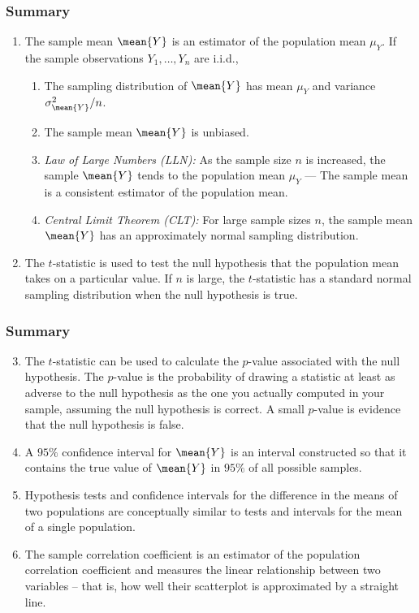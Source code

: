 

\begin{frame}
\frametitle{Summary}
\begin{enumerate}
\item The sample mean $\mean{Y}$ is an estimator of the population mean $\mu_{Y}$. If the sample observations $Y_1,\ldots,Y_n$ are i.i.d.,
\begin{enumerate}
\item The sampling distribution of $\mean{Y}$ has mean $\mu_{Y}$ and variance $\sigma^2_{\mean{Y}}/n$.
\item The sample mean $\mean{Y}$ is unbiased.
\item \textit{Law of Large Numbers (LLN):} As the sample size $n$ is increased, the sample $\mean{Y}$ tends to the population mean $\mu_{Y}$ --- The sample mean is a consistent estimator of the population mean.
\item \textit{Central Limit Theorem (CLT):} For large sample sizes $n$, the sample mean $\mean{Y}$ has an approximately normal sampling distribution.
\end{enumerate}
\item The $t$-statistic is used to test the null hypothesis that the population mean takes on a particular value. If $n$ is large, the $t$-statistic has a standard normal sampling distribution when the null hypothesis is true.
\end{enumerate}
\end{frame}


\begin{frame}
\frametitle{Summary}
\begin{enumerate}\setcounter{enumi}{2}
\item The $t$-statistic can be used to calculate the $p$-value associated with the null hypothesis. The $p$-value is the probability of drawing a statistic at least as adverse to the null hypothesis as the one you actually computed in your sample, assuming the null hypothesis is correct. A small $p$-value is evidence that the null hypothesis is false.
\item A $95\%$ confidence interval for $\mean{Y}$ is an interval constructed so that it contains the true value of $\mean{Y}$ in $95\%$ of all possible samples.
\item Hypothesis tests and confidence intervals for the difference in the means of two populations are conceptually similar to tests and intervals for the mean of a single population.
\item The sample correlation coefficient is an estimator of the population correlation coefficient and measures the linear relationship between two variables -- that is, how well their scatterplot is approximated by a straight line.
\end{enumerate}
\end{frame}
